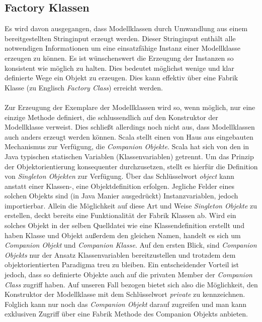 \subsection{Factory Klassen}
Es wird davon ausgegangen, dass Modellklassen durch Umwandlung aus einem bereitgestellten Stringinput erzeugt werden. Dieser Stringinput enthält alle notwendigen Informationen um eine einsatzfähige Instanz einer Modellklasse erzeugen zu können. Es ist wünschenswert die Erzeugung der Instanzen so konsistent wie möglich zu halten. Dies bedeutet möglichst wenige und klar definierte Wege ein Objekt zu erzeugen. Dies kann effektiv über eine Fabrik Klasse (zu Englisch \textit{Factory Class}) erreicht werden.\\\\Zur Erzeugung der Exemplare der Modellklassen wird so, wenn möglich, nur eine einzige Methode definiert, die schlussendlich auf den Konstruktor der Modellklasse verweist. Dies schließt allerdings noch nicht aus, dass Modellklassen auch anders erzeugt werden können. Scala stellt einen von Haus aus eingebauten Mechanismus zur Verfügung, die \textit{Companion Objekte}. Scala hat sich von den in Java typischen statischen Variablen (Klassenvariablen) getrennt. Um das Prinzip der Objektorientierung konsequenter durchzusetzen, stellt es hierfür die Definition von \textit{Singleton Objekten} zur Verfügung. Über das Schlüsselwort \textit{object} kann anstatt einer Klassen-, eine Objektdefinition erfolgen. Jegliche Felder eines solchen Objekts sind (in Java Manier ausgedrückt) Instanzvariablen, jedoch importierbar. Allein die Möglichkeit auf diese Art und Weise \textit{Singleton Objekte} zu erstellen, deckt bereits eine Funktionalität der Fabrik Klassen ab. Wird ein solches Objekt in der selben Quelldatei wie eine Klassendefinition erstellt und haben Klasse und Objekt außerdem den gleichen Namen, handelt es sich um \textit{Companion Objekt} und \textit{Companion Klasse}. Auf den ersten Blick, sind \textit{Companion Objekts} nur der Ansatz Klassenvariablen bereitzustellen und trotzdem dem objektorientierten Paradigma treu zu bleiben. Ein entscheidender Vorteil ist jedoch, dass so definierte Objekte auch auf die privaten Member der \textit{Companion Class} zugriff haben. Auf unseren Fall bezogen bietet sich also die Möglichkeit, den Konstruktor der Modellklasse mit dem Schlüsselwort \textit{private} zu kennzeichnen. Folglich kann nur noch das \textit{Companion Objekt} darauf zugreifen und man kann exklusiven Zugriff über eine Fabrik Methode des Companion Objekts anbieten. 
